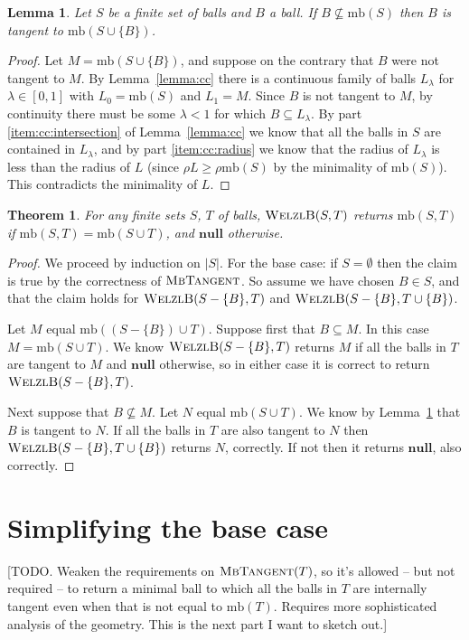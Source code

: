 \documentclass[a4paper]{article}
\newtheorem{lemma}{Lemma}[section]
\newtheorem{theorem}{Theorem}[section]
\newcommand\alg[1]{\mbox{\textsc{#1}}}
\newcommand\undef{\mathbf{null}}
\newcommand\mb{\mathrm{mb}}
\let\radius\rho
\begin{document}
\begin{lemma}\label{lemma:tangent}
  Let $S$ be a finite set of balls and $B$ a ball. If $B\not\subseteq\mb(S)$ then $B$ is tangent to $\mb(S\cup\{B\})$.
\end{lemma}
\begin{proof}
  Let $M = \mb(S\cup\{B\})$, and suppose on the contrary that $B$ were not tangent to $M$.
  By Lemma~\ref{lemma:cc} there is a continuous family of balls $L_\lambda$ for $\lambda\in[0,1]$
  with $L_0=\mb(S)$ and $L_1=M$. Since $B$ is not tangent to $M$, by continuity there must be some $\lambda<1$ for which $B\subseteq L_\lambda$. By part \ref{item:cc:intersection} of Lemma~\ref{lemma:cc} we know that all the balls in $S$ are contained in $L_\lambda$, and by part \ref{item:cc:radius} we know that the radius of $L_\lambda$ is less than the radius of $L$ (since $\radius L\geq \radius\mb(S)$ by the minimality of $\mb(S)$). This contradicts the minimality of $L$.
\end{proof}

\begin{theorem}
  For any finite sets $S$, $T$ of balls, $\alg{WelzlB}(S,T)$ returns $\mb(S,T)$ if $\mb(S,T)=\mb(S\cup T)$, and $\undef$ otherwise.
\end{theorem}
\begin{proof}
  We proceed by induction on $|S|$. For the base case: if $S=\emptyset$ then the claim is true by the correctness of $\alg{MbTangent}$. So assume we have chosen $B\in S$, and that the claim holds for $\alg{WelzlB}(S-\{B\},T)$ and $\alg{WelzlB}(S-\{B\},T\cup\{B\})$.

  Let $M$ equal $\mb((S-\{B\})\cup T)$. Suppose first that $B\subseteq M$. In this case $M=\mb(S\cup T)$. We know $\alg{WelzlB}(S-\{B\},T)$ returns $M$ if all the balls in $T$ are tangent to $M$ and $\undef$ otherwise, so in either case it is correct to return $\alg{WelzlB}(S-\{B\},T)$.

  Next suppose that $B\not\subseteq M$. Let $N$ equal $\mb(S\cup T)$. We know by Lemma~\ref{lemma:tangent} that $B$ is tangent to $N$. If all the balls in $T$ are also tangent to $N$ then $\alg{WelzlB}(S-\{B\}, T\cup\{B\})$ returns $N$, correctly. If not then it returns $\undef$, also correctly.
\end{proof}

\section{Simplifying the base case}
[TODO. Weaken the requirements on $\alg{MbTangent}(T)$, so it's allowed -- but not required -- to return a minimal ball to which all the balls in $T$ are internally tangent even when that is not equal to $\mb(T)$. Requires more sophisticated analysis of the geometry. This is the next part I want to sketch out.]
\end{document}
